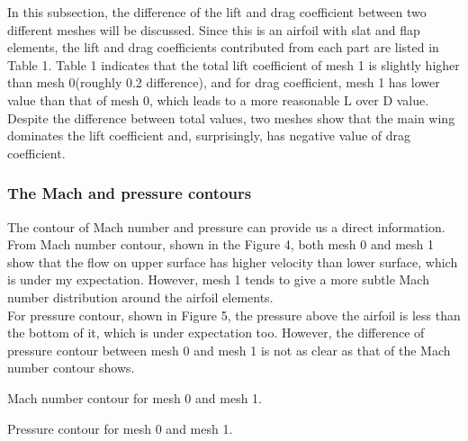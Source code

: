 \documentclass[letterpaper,onecolumn,12pt]{article}
\makeatletter
\newenvironment{figurehere}
  {\def\@captype{figure}}{}
\makeatother
\begin{document}
\bigskip

In this subsection, the difference of the lift and drag coefficient between two different meshes will be discussed. Since this is an airfoil with slat and flap elements, the lift and drag coefficients contributed from each part are listed in Table 1. Table 1 indicates that the total lift coefficient of mesh 1 is slightly higher than mesh 0(roughly 0.2 difference), and for drag coefficient, mesh 1 has lower value than that of mesh 0, which leads to a more reasonable L over D value. Despite the difference between total values, two meshes show that the main wing dominates the lift coefficient and, surprisingly, has negative value of drag coefficient.


\subsubsection{The Mach and pressure contours}
The contour of Mach number and pressure can provide us a direct information. From Mach number contour, shown in the Figure 4, both mesh 0 and mesh 1 show that the flow on upper surface has higher velocity than lower surface, which is under my expectation. However, mesh 1 tends to give a more subtle Mach number distribution around the airfoil elements. \\

For pressure contour, shown in Figure 5, the pressure above the airfoil is less than the bottom of it, which is under expectation too. However, the difference of pressure contour between mesh 0 and mesh 1 is not as clear as that of the Mach number contour shows. 

\begin{figurehere}
 \centering 
  \hspace{.05cm} 
  \caption{Mach number contour for mesh 0 and mesh 1.} 
\end{figurehere}

\begin{figurehere}
 \centering 
  \hspace{.05cm} 
  \caption{Pressure contour for mesh 0 and mesh 1.} 
\end{figurehere}
\end{document}
